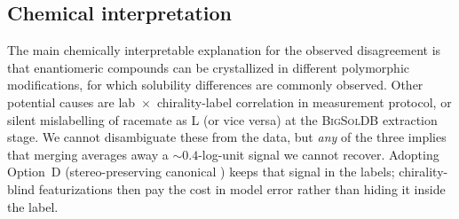 \subsection{Chemical interpretation}

The main chemically interpretable explanation for the observed
disagreement is that enantiomeric compounds can be crystallized in
different polymorphic modifications, for which solubility differences
are commonly observed.  Other potential causes are
lab~$\times$~chirality-label correlation in measurement protocol, or
silent mislabelling of racemate as L (or vice versa) at the
\textsc{BigSolDB} extraction stage.  We cannot disambiguate these from
the data, but \emph{any} of the three implies that merging averages
away a $\sim 0.4$-log-unit signal we cannot recover.  Adopting Option~D
(stereo-preserving canonical \SMILES) keeps that signal in the labels;
chirality-blind featurizations then pay the cost in model error rather
than hiding it inside the label.
